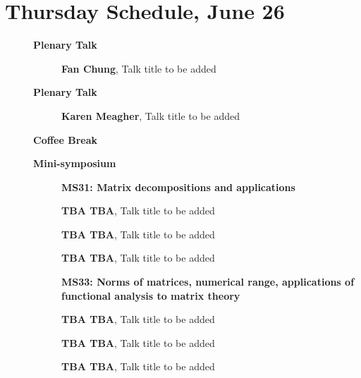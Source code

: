 \documentclass[ILAS2025-program.tex]{subfiles}
\begin{document}
\section{Thursday Schedule, June 26}
    
    \begin{description}
    \item[] \textbf{Plenary Talk} 
    \begin{description}
        \item[] \textbf{Fan Chung}, Talk title to be added
        \end{description}
        \item[] \textbf{Plenary Talk} 
    \begin{description}
        \item[] \textbf{Karen Meagher}, Talk title to be added
        \end{description}
        \item[] \textbf{Coffee Break} 
    \item[] \textbf{Mini-symposium} 
    \begin{description}
    \item[] \textbf{MS31: Matrix decompositions and applications} 
    \item[] \textbf{TBA TBA}, Talk title to be added
        \item[] \textbf{TBA TBA}, Talk title to be added
        \item[] \textbf{TBA TBA}, Talk title to be added
        \end{description}
    \begin{description}
    \item[] \textbf{MS33: Norms of matrices, numerical range, applications of functional analysis to matrix theory} 
    \item[] \textbf{TBA TBA}, Talk title to be added
        \item[] \textbf{TBA TBA}, Talk title to be added
        \item[] \textbf{TBA TBA}, Talk title to be added
        \end{description}
    \begin{description}

\end{description}
\end{description}
\end{document}
